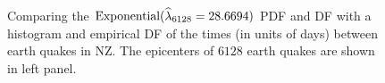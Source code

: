 \begin{example}
\begin{figure}[htpb]
\caption{Comparing the $\mbox{{\rm Exponential}}(\widehat{\lambda}_{6128}= 28.6694)$ PDF and DF with a histogram and empirical DF of the times (in units of days) between earth quakes in  NZ.  The epicenters of $6128$ earth quakes are shown in left panel.\label{F:NZSIEarthQuakesExponentialMLE}}
\centering   {}
\end{figure}
\end{example}

